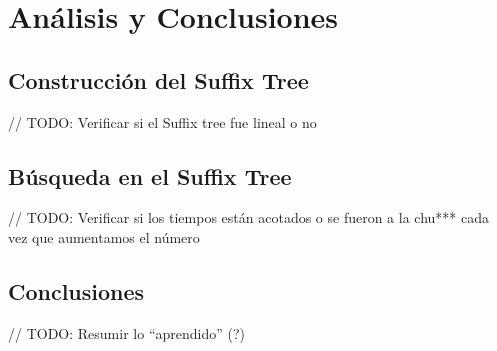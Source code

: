 \documentclass[letterpaper,10pt]{article}
\begin{document}
	\section{Análisis y Conclusiones}

	\subsection{Construcción del Suffix Tree}

	// TODO: Verificar si el Suffix tree fue lineal o no

	\subsection{Búsqueda en el Suffix Tree}

	// TODO: Verificar si los tiempos están acotados o se fueron a la chu*** cada vez que aumentamos el número

	\subsection{Conclusiones}

	// TODO: Resumir lo ``aprendido'' (?)
\end{document}
